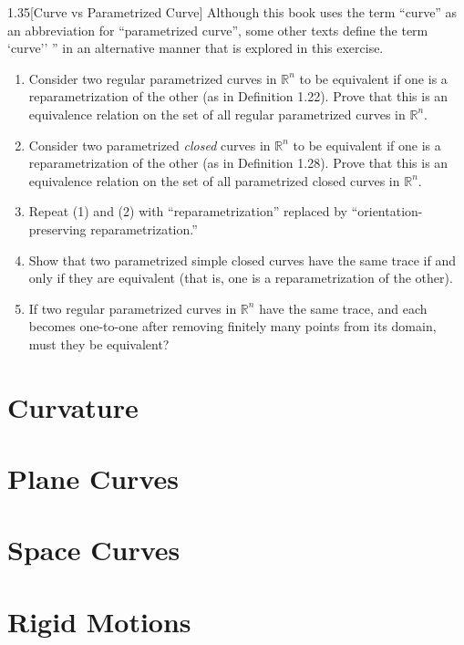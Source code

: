 \begin{exercise}{1.35}[Curve vs Parametrized Curve]
	Although this book uses the term ``curve'' as an abbreviation for ``parametrized curve'', some other texts define the term `curve'' ” in an alternative manner that is explored in this exercise.
	\begin{enumerate}[label={(\arabic*)}]
		\item  Consider two regular parametrized curves in $\mathbb{R}^{n}$ to be equivalent if one is a reparametrization of the other (as in Definition 1.22). Prove that this is an equivalence relation on the set of all regular parametrized curves in $\mathbb{R}^{n}$.
		\item Consider two parametrized \textit{closed} curves in $\mathbb{R}^{n}$ to be equivalent if one is a reparametrization of the other (as in Definition 1.28). Prove that this is an equivalence relation on the set of all parametrized closed curves in $\mathbb{R}^{n}$.
		\item Repeat (1) and (2) with ``reparametrization'' replaced by ``orientation-preserving reparametrization{.}''
		\item  Show that two parametrized simple closed curves have the same trace if and only if they are equivalent (that is, one is a reparametrization of the other).
		\item If two regular parametrized curves in $\mathbb{R}^{n}$ have the same trace, and each becomes one-to-one after removing finitely many points from its domain, must they be equivalent?
	\end{enumerate}
\end{exercise}

\section{Curvature}

\section{Plane Curves}

\section{Space Curves}

\section{Rigid Motions}
